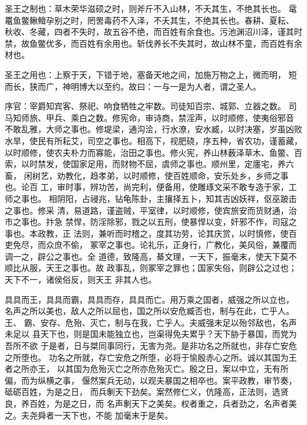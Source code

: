 \documentclass[]{article}
\begin{document}
圣王之制也：草木荣华滋硕之时，则斧斤不入山林，不夭其生，不绝其长也。
鼋鼍鱼鳖鳅鳣孕别之时，罔罟毒药不入泽，不夭其生，不绝其长也。春耕、夏耘、
秋收、冬藏，四者不失时，故五谷不绝，而百姓有余食也。污池渊沼川泽，谨其时
禁，故鱼鳖优多，而百姓有余用也。斩伐养长不失其时，故山林不童，而百姓有余
材也。

圣王之用也：上察于天，下错于地，塞备天地之间，加施万物之上，微而明，
短而长，狭而广，神明博大以至约。故曰：一与一是为人者，谓之圣人。

序官：宰爵知宾客、祭祀、响食牺牲之牢数。司徒知百宗、城郭、立器之数。
司马知师旅、甲兵、乘白之数。修宪命，审诗商，禁淫声，以时顺修，使夷俗邪音
不敢乱雅，大师之事也。修堤梁，通沟浍，行水潦，安水臧，以时决塞，岁虽凶败
水旱，使民有所耘艾，司空之事也。相高下，视肥硗，序五种，省农功，谨蓄藏，
以时顺修，使农夫朴力而寡能，治田之事也。修火宪，养山林薮泽草木、鱼鳖、百
索，以时禁发，使国家足用，而财物不屈，虞师之事也。顺州里，定廛宅，养六畜，
闲树艺，劝教化，趋孝弟，以时顺修，使百姓顺命，安乐处乡，乡师之事也。论百
工，审时事，辨功苦，尚完利，便备用，使雕琢文采不敢专造于家，工师之事也。
相阴阳，占祲兆，钻龟陈卦，主攘择五卜，知其吉凶妖祥，伛巫跛击之事也。修采
清，易道路，谨盗贼，平室律，以时顺修，使宾旅安而货财通，治市之事也。抃急
禁悍，防淫除邪，戮之以五刑，使暴悍以变，奸邪不作，司寇之事也。本政教，正
法则，兼听而时稽之，度其功劳，论其庆赏，以时慎修，使百吏免尽，而众庶不偷，
冢宰之事也。论礼乐，正身行，广教化，美风俗，兼覆而调一之，辟公之事也。全
道德，致隆高，綦文理，一天下，振毫末，使天下莫不顺比从服，天王之事也。故
政事乱，则冢宰之罪也；国家失俗，则辟公之过也；天下不一，诸侯俗反，则天王
非其人也。

具具而王，具具而霸，具具而存，具具而亡。用万乘之国者，威强之所以立也，
名声之所以美也，敌人之所以屈也，国之所以安危臧否也，制与在此，亡乎人。王、
霸、安存、危殆、灭亡，制与在我，亡乎人。夫威强未足以殆邻敌也，名声未足以
县天下也，则是国未能独立也，岂渠得免夫累乎？天下胁于暴国，而党为吾所不欲
于是者，日与桀同事同行，无害为尧。是非功名之所就也，非存亡安危之所堕也。
功名之所就，存亡安危之所堕，必将于愉殷赤心之所。诚以其国为王者之所亦王，
以其国为危殆灭亡之所亦危殆灭亡。殷之日，案以中立，无有所偏，而为纵横之事，
偃然案兵无动，以观夫暴国之相卒也。案平政教，审节奏，砥砺百姓，为是之日，
而兵剸天下劲矣。案然修仁义，伉隆高，正法则，选贤良，养百姓，为是之日，而
名声剸天下之美矣。权者重之，兵者劲之，名声者美之。夫尧舜者一天下也，不能
加毫末于是矣。
\end{document}
